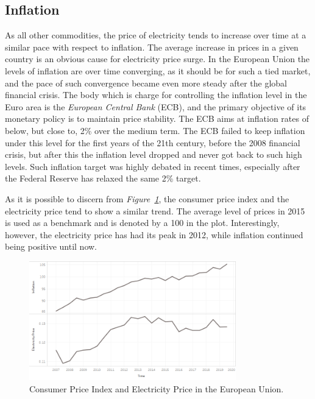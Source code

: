 \documentclass[a4paper,12pt]{book}
\begin{document}
\subsection{Inflation}

As all other commodities, the price of electricity tends to increase over time at a similar pace with respect to inflation. The average increase in prices in a given country is an obvious cause for electricity price surge. In the European Union the levels of inflation are over time converging, as it should be for such a tied market, and the pace of such convergence became even more steady after the global financial crisis. \cite{brovz2018dynamics} The body which is charge for controlling the inflation level in the Euro area is the \textit{European Central Bank} (ECB), and the primary objective of its monetary policy is to maintain price stability. The ECB aims at inflation rates of below, but close to, 2\% over the medium term. The ECB failed to keep inflation under this level for the first years of the 21th century, before the 2008 financial crisis, but after this the inflation level dropped and never got back to such high levels. Such inflation target was highly debated in recent times, especially after the Federal Reserve has relaxed the same 2\% target.

As it is possible to discern from \textit{Figure~\ref{fig:infl}}, the consumer price index and the electricity price tend to show a similar trend. The average level of prices in 2015 is used as a benchmark and is denoted by a 100 in the plot. Interestingly, however, the electricity price has had its peak in 2012, while inflation continued being positive until now.

\begin{figure}[tb]
\begin{center}
\captionsetup{justification=centering}
\includegraphics[width=0.8\textwidth]{Images/inf.png}
\caption{Consumer Price Index and Electricity Price in the European Union.}
\label{fig:infl}
\end{center}
\end{figure}
\end{document}
